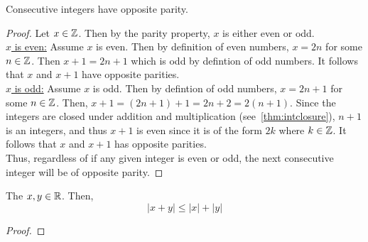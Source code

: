 \begin{tcolorbox}[colback=pink!70]
    \begin{theorem}
        Consecutive integers have opposite parity.
    \end{theorem}
    \begin{proof}
        Let $x \in \mathbb Z$. Then by the parity property, $x$ is either even or odd. \\
        \hspace*{2em}\underline{$x$ is even:} Assume $x$ is even. Then by definition of even numbers, $x = 2n$ for some $n \in \mathbb Z$. Then $x+1 = 2n+1$ which is odd by defintion of odd numbers. It follows that $x$ and $x+1$ have opposite parities.  \\
        \hspace*{2em}\underline{$x$ is odd:} Assume $x$ is odd. Then by defintion of odd numbers, $x = 2n+1$ for some $n\in\mathbb Z$. Then, $x+1 = (2n + 1) + 1 = 2n + 2 = 2(n + 1)$. Since the integers are closed under addition and multiplication (see~\ref{thm:intclosure}), $n+1$ is an integers, and thus $x+1$ is even since it is of the form $2k$ where $k \in \mathbb Z$. It follows that $x$ and $x+1$ has opposite parities. \\
        Thus, regardless of if any given integer is even or odd, the next consecutive integer will be of opposite parity.
    \end{proof}
\end{tcolorbox}

\begin{tcolorbox}[colback=pink!70]
\begin{theorem}
    The $x, y \in \mathbb R$. Then, 
    \begin{equation*}
        |x + y| \leq |x| + |y|
    \end{equation*}
\end{theorem}
\begin{proof}
    
\end{proof}
\end{tcolorbox}